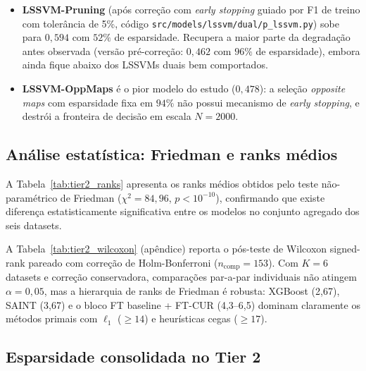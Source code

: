 \documentclass[12pt,a4paper]{article}
\begin{document}
\begin{itemize}
        $\Delta \approx -0{,}13$ vs.\ LSSVM-Std denso. Analisado em
        Seção~\ref{sec:tier2_primal_collapse}.
  \item \textbf{LSSVM-Pruning} (após correção com \emph{early stopping}
        guiado por F1 de treino com tolerância de 5\%, código
        \texttt{src/models/lssvm/dual/p\_lssvm.py}) sobe para $0{,}594$
        com $52\%$ de esparsidade. Recupera a maior parte da degradação
        antes observada (versão pré-correção: $0{,}462$ com $96\%$ de
        esparsidade), embora ainda fique abaixo dos LSSVMs duais bem
        comportados.
  \item \textbf{LSSVM-OppMaps} é o pior modelo do estudo ($0{,}478$): a
        seleção \emph{opposite maps} com esparsidade fixa em $94\%$ não
        possui mecanismo de \emph{early stopping}, e destrói a fronteira
        de decisão em escala $N=2000$.
\end{itemize}

\subsection{Análise estatística: Friedman e ranks médios}

A Tabela~\ref{tab:tier2_ranks} apresenta os ranks médios obtidos pelo teste
não-paramétrico de Friedman ($\chi^2 = 84{,}96$, $p < 10^{-10}$), confirmando
que existe diferença estatisticamente significativa entre os modelos no
conjunto agregado dos seis datasets.



A Tabela~\ref{tab:tier2_wilcoxon} (apêndice) reporta o pós-teste de Wilcoxon
signed-rank pareado com correção de Holm-Bonferroni ($n_{\text{comp}}=153$).
Com $K=6$ datasets e correção conservadora, comparações par-a-par individuais
não atingem $\alpha=0{,}05$, mas a hierarquia de ranks de Friedman é
robusta: XGBoost (2,67), SAINT (3,67) e o bloco FT baseline + FT-CUR
(4,3--6,5) dominam claramente os métodos primais com $\ell_1$ ($\geq 14$) e
heurísticas cegas ($\geq 17$).

\subsection{Esparsidade consolidada no Tier 2}
\label{sec:tier2_sparsity}


\end{document}
